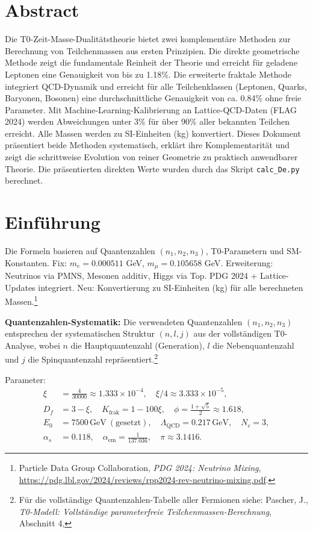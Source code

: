 \section*{Abstract}
		Die T0-Zeit-Masse-Dualitätstheorie bietet zwei komplementäre Methoden zur Berechnung von Teilchenmassen aus ersten Prinzipien. Die direkte geometrische Methode zeigt die fundamentale Reinheit der Theorie und erreicht für geladene Leptonen eine Genauigkeit von bis zu 1.18\%. Die erweiterte fraktale Methode integriert QCD-Dynamik und erreicht für alle Teilchenklassen (Leptonen, Quarks, Baryonen, Bosonen) eine durchschnittliche Genauigkeit von ca. 0.84\% ohne freie Parameter. Mit Machine-Learning-Kalibrierung an Lattice-QCD-Daten (FLAG 2024) werden Abweichungen unter 3\% für über 90\% aller bekannten Teilchen erreicht. Alle Massen werden zu SI-Einheiten (kg) konvertiert. Dieses Dokument präsentiert beide Methoden systematisch, erklärt ihre Komplementarität und zeigt die schrittweise Evolution von reiner Geometrie zu praktisch anwendbarer Theorie. Die präsentierten direkten Werte wurden durch das Skript \texttt{calc\_De.py} berechnet.

	
	
	\section{Einführung}
	\label{sec:einfuehrung}
	
	Die Formeln basieren auf Quantenzahlen $(n_1, n_2, n_3)$, T0-Parametern und SM-Konstanten. Fix: $m_e = 0.000511$ GeV, $m_\mu = 0.105658$ GeV. Erweiterung: Neutrinos via PMNS, Mesonen additiv, Higgs via Top. PDG 2024 + Lattice-Updates integriert. Neu: Konvertierung zu SI-Einheiten (kg) für alle berechneten Massen.\footnote{Particle Data Group Collaboration, \emph{PDG 2024: Neutrino Mixing}, \url{https://pdg.lbl.gov/2024/reviews/rpp2024-rev-neutrino-mixing.pdf}.}
	
	\textbf{Quantenzahlen-Systematik:} Die verwendeten Quantenzahlen $(n_1, n_2, n_3)$ entsprechen der systematischen Struktur $(n, l, j)$ aus der vollständigen T0-Analyse, wobei $n$ die Hauptquantenzahl (Generation), $l$ die Nebenquantenzahl und $j$ die Spinquantenzahl repräsentiert.\footnote{Für die vollständige Quantenzahlen-Tabelle aller Fermionen siehe: Pascher, J., \emph{T0-Modell: Vollständige parameterfreie Teilchenmassen-Berechnung}, Abschnitt 4, }
	
	Parameter:
	\begin{align}
		\xi &= \frac{4}{30000} \approx 1.333 \times 10^{-4}, \quad \xi/4 \approx 3.333 \times 10^{-5}, \nonumber \\
		D_f &= 3 - \xi, \quad K_{\text{frak}} = 1 - 100\xi, \quad \phi = \frac{1 + \sqrt{5}}{2} \approx 1.618, \nonumber \\
		E_0 &= 7500 \, \text{GeV}\ (\text{gesetzt}), \quad \Lambda_{\text{QCD}} = 0.217 \, \text{GeV}, \quad N_c = 3, \nonumber \\
		\alpha_s &= 0.118, \quad \alpha_{\text{em}} = \frac{1}{137.036}, \quad \pi \approx 3.1416.
	\end{align}

